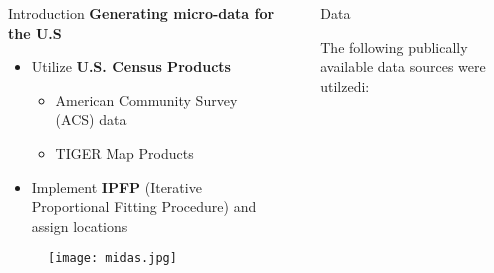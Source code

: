 \documentclass[final]{beamer}
\newlength{\sepwid}
\newlength{\onecolwid}
\newlength{\twocolwid}
\begin{document}
\begin{frame}[t]
\begin{columns}[t]
\begin{column}{\onecolwid}
\begin{block}{Introduction}
\textbf{Generating micro-data for the U.S}
\begin{itemize}
\item Utilize \textbf{U.S. Census Products}
\begin{itemize}
\item American Community Survey (ACS) data
\item TIGER Map Products
\end{itemize}
\item Implement \textbf{IPFP} (Iterative Proportional Fitting Procedure) and assign locations
\end{itemize}



\end{block}


\begin{figure}\label{midas}
\texttt{[image: midas.jpg]}
\end{figure}


\end{column} %

\begin{column}{\sepwid}\end{column} %

\begin{column}{\twocolwid} %

\begin{columns}[t,totalwidth=\twocolwid] %

\begin{column}{\onecolwid}\vspace{-.6in} %


\begin{block}{Data}

The following publically available data sources were utilzedi:


\end{block}
\end{column}
\end{columns}
\end{column}
\end{columns}
\end{frame}
\end{document}
